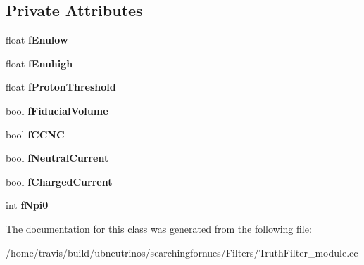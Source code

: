\subsection*{Private Attributes}
\begin{DoxyCompactItemize}
\item 
\hypertarget{classTruthFilter_a17edb6af974475826b0a8b9e18c289e8}{float {\bfseries f\-Enulow}}\label{classTruthFilter_a17edb6af974475826b0a8b9e18c289e8}

\item 
\hypertarget{classTruthFilter_a982d272becaf972f8f39a9735762d58d}{float {\bfseries f\-Enuhigh}}\label{classTruthFilter_a982d272becaf972f8f39a9735762d58d}

\item 
\hypertarget{classTruthFilter_a9dd14e4912aeaea0871aa1683bdfd4b5}{float {\bfseries f\-Proton\-Threshold}}\label{classTruthFilter_a9dd14e4912aeaea0871aa1683bdfd4b5}

\item 
\hypertarget{classTruthFilter_a0dcfc4bfb7d01bf7290bd0cb0d531659}{bool {\bfseries f\-Fiducial\-Volume}}\label{classTruthFilter_a0dcfc4bfb7d01bf7290bd0cb0d531659}

\item 
\hypertarget{classTruthFilter_a69b68c339f5b958a436bb370842f6880}{bool {\bfseries f\-C\-C\-N\-C}}\label{classTruthFilter_a69b68c339f5b958a436bb370842f6880}

\item 
\hypertarget{classTruthFilter_a1896a896e527f01cdaf57d9fd2a70d6f}{bool {\bfseries f\-Neutral\-Current}}\label{classTruthFilter_a1896a896e527f01cdaf57d9fd2a70d6f}

\item 
\hypertarget{classTruthFilter_a9063ad664e9c091c25b719a4e492c965}{bool {\bfseries f\-Charged\-Current}}\label{classTruthFilter_a9063ad664e9c091c25b719a4e492c965}

\item 
\hypertarget{classTruthFilter_a8ae8363120360281655b37ffbce3ac66}{int {\bfseries f\-Npi0}}\label{classTruthFilter_a8ae8363120360281655b37ffbce3ac66}

\end{DoxyCompactItemize}


The documentation for this class was generated from the following file\-:\begin{DoxyCompactItemize}
\item 
/home/travis/build/ubneutrinos/searchingfornues/\-Filters/Truth\-Filter\-\_\-module.\-cc\end{DoxyCompactItemize}
